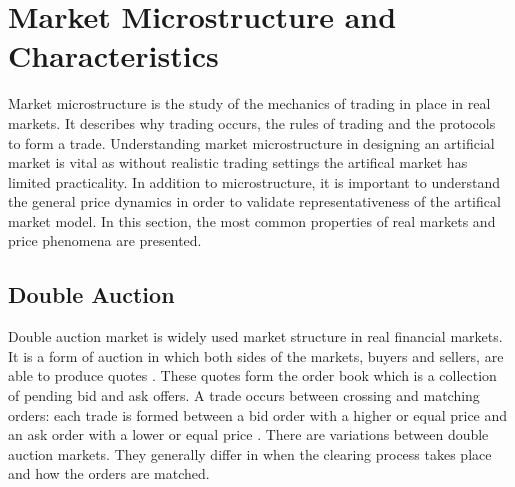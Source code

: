 \section{Market Microstructure and Characteristics}

Market microstructure is the study of the mechanics of trading in place 
in real markets. It describes why trading occurs, the rules of trading 
and the protocols to form a trade. \citep[p. 3-4]{Has07}
Understanding market microstructure in designing an artificial market
is vital as without realistic trading settings the artifical market 
has limited practicality. In addition to microstructure, it is important
to understand the general price dynamics in order to validate representativeness
of the artifical market model. In this section, the most common 
properties of real markets and price phenomena are presented. 


\subsection{Double Auction}

Double auction market is widely used market structure in real 
financial markets. It is a form of auction 
in which both sides of the markets, buyers and sellers, are able to 
produce quotes \citep*{Kle99}. These quotes form the order book 
which is a collection of pending bid and ask offers. A trade 
occurs between crossing and matching orders: each trade is formed between 
a bid order with a higher or equal price and an ask order with a lower 
or equal price \citep*{Ben12}. There are variations between double auction markets.
They generally differ in when the clearing process takes place 
and how the orders are matched. 


